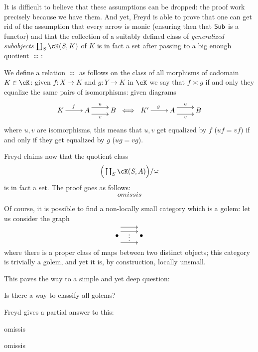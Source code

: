\documentclass[a4paper,10pt,draft]{amsart}
\begin{document}



It is difficult to believe that these assumptions can be dropped: the proof work precisely because we have them. And yet, Freyd is able to prove that one can get rid of the assumption that every arrow is monic (ensuring then that $\textsf{Sub}$ is a functor) and that the collection of a suitably defined class of \emph{generalized subobjects} $\coprod_S\cK(S,K)$ of $K$ is in fact a set after passing to a big enough quotient $\asymp$:
\begin{definition}
We define a relation $\asymp$ as follows on the class of all morphisms of codomain $K\in\cK$: given $f \colon X \to K$ and $g\colon Y\to K$ in $\cK$ we say that $f\asymp g$ if and only they equalize the same pairs of isomorphisms: given diagrams
\[
\xymatrix{
	K \ar[r]^f & A \ar@<5pt>[r]^u\ar@<-5pt>[r]_v & B
}
\iff
\xymatrix{
	K' \ar[r]^g & A \ar@<5pt>[r]^u\ar@<-5pt>[r]_v & B
}
\]
where $u,v$ are isomorphisms, this means that $u,v$ get equalized by $f$ (\ie $uf = vf$) if and only if they get equalized by $g$ (\ie $ug=vg$).
\end{definition}
Freyd claims now that the quotient class
\[
\Big(\textstyle\coprod_S \cK(S,A)\Big)/{\asymp}
\]
is in fact a set. The proof goes as follows:
\[
omissis
\]
\begin{remark}
Of course, it is possible to find a non-locally small category which is a golem: let us consider the graph
\[
\xymatrix{\bullet \ar@<12pt>[r] \ar@<6pt>[r] \ar@<-10pt>[r] \ar@{}[r]|\vdots & \bullet}
\]
where there is a proper class of maps between two distinct objects; this category is trivially a golem, and yet it is, by construction, locally unsmall.
\end{remark}
This paves the way to a simple and yet deep question: 
\begin{question}
Is there a way to classify all golems?
\end{question}
Freyd gives a partial answer to this:
\begin{definition}
omissis
\end{definition}
\begin{proposition}
omissis
\end{proposition}
 
\end{document}
